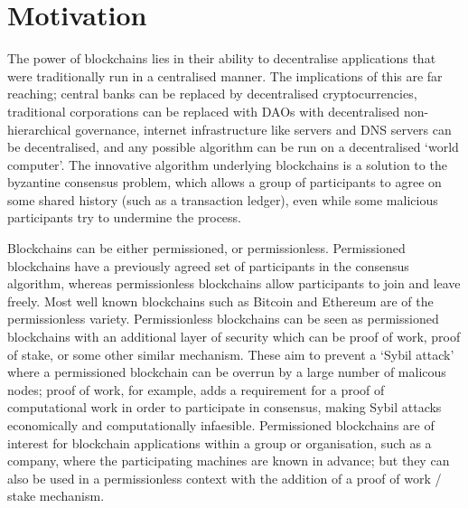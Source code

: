 

\section{Motivation}
The power of blockchains lies in their ability to decentralise applications that were traditionally run in a centralised manner. The implications of this are far reaching; central banks can be replaced by decentralised cryptocurrencies, traditional corporations can be replaced with DAOs with decentralised non-hierarchical governance, internet infrastructure like servers and DNS servers can be decentralised, and any possible algorithm can be run on a decentralised `world computer'. The innovative algorithm underlying blockchains is a solution to the byzantine consensus problem, which allows a group of participants to agree on some shared history (such as a transaction ledger), even while some malicious participants try to undermine the process.

Blockchains can be either permissioned, or permissionless. Permissioned blockchains have a previously agreed set of participants in the consensus algorithm, whereas permissionless blockchains allow participants to join and leave freely. Most well known blockchains such as Bitcoin and Ethereum are of the permissionless variety. Permissionless blockchains can be seen as permissioned blockchains with an additional layer of security which can be proof of work, proof of stake, or some other similar mechanism. These aim to prevent a `Sybil attack' where a permissioned blockchain can be overrun by a large number of malicous nodes; proof of work, for example, adds a requirement for a proof of computational work in order to participate in consensus, making Sybil attacks economically and computationally infaesible. Permissioned blockchains are of interest for blockchain applications within a group or organisation, such as a company, where the participating machines are known in advance; but they can also be used in a permissionless context with the addition of a proof of work / stake mechanism.

